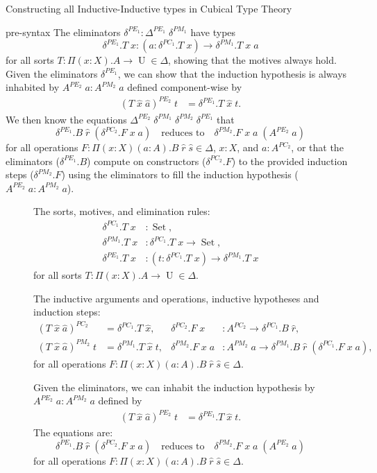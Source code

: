 \documentclass[runningheads]{llncs}
\DeclareMathOperator{\USet}{Set}
\DeclareMathOperator{\UU}{U}
\begin{document}
{\begin{section}{Constructing all Inductive-Inductive types in Cubical Type Theory}
\begin{subsection}{pre-syntax}
The eliminators $\delta^{PE_1} : \Delta^{PE_1}\;\delta^{PM_1}$ have types \[\delta^{PE_1}.T\;x : (a : \delta^{PC_1}.T\;x) \to \delta^{PM_1}.T\;x\;a\] for all sorts $T : \Pi(x : X).A\to\UU \in\Delta$, showing that the motives always hold. Given the eliminators $\delta^{PE_1}$, we can show that the induction hypothesis is always inhabited by $A^{PE_2}\;a : A^{PM_2}\;a$ defined component-wise by \begin{align*}(T\;\hat{x}\;\hat{a})^{PE_2}\;t &= \delta^{PE_1}.T\;\hat{x}\;t.\end{align*} We then know the equations $\Delta^{PE_2}\;\delta^{PM_1}\;\delta^{PM_2}\;\delta^{PE_1}$ that \[\delta^{PE_1}.B\;\hat{r}\;(\delta^{PC_2}.F\;x\;a)\quad\text{reduces to}\quad \delta^{PM_2}.F\;x\;a\;(A^{PE_2}\;a)\] for all operations $F : \Pi(x : X)(a : A).B\;\hat{r}\;\hat{s} \in \Delta$, $x : X$, and $a : A^{PC_2}$, or that the eliminators ($\delta^{PE_1}.B$) compute on constructors ($\delta^{PC_2}.F$) to the provided induction steps ($\delta^{PM_2}.F$) using the eliminators to fill the induction hypothesis ($A^{PE_2}\;a : A^{PM_2}\;a$).

\begin{figure}[htpb]
    \begin{flushleft}
    The sorts, motives, and elimination rules:
    \begin{align*}
    \delta^{PC_1}.T\;x &: \USet,\\
    \delta^{PM_1}.T\;x &: \delta^{PC_1}.T\;x \to \USet,\\
    \delta^{PE_1}.T\;x &: (t : \delta^{PC_1}.T\;x) \to \delta^{PM_1}.T\;x
    \end{align*}
    for all sorts $T : \Pi(x : X).A\to\UU \in\Delta$.
    
    The inductive arguments and operations, inductive hypotheses and induction steps:
    \begin{align*}
    (T\;\hat{x}\;\hat{a})^{PC_2} &= \delta^{PC_1}.T\;\hat{x},
    &\delta^{PC_2}.F\;x &: A^{PC_2} \to \delta^{PC_1}.B\;\hat{r},\\
    (T\;\hat{x}\;\hat{a})^{PM_2}\;t &= \delta^{PM_1}.T\;\hat{x}\;t,
    &\delta^{PM_2}.F\;x\;a &: A^{PM_2}\;a \to \delta^{PM_1}.B\;\hat{r}\;(\delta^{PC_1}.F\;x\;a),
    \end{align*}
    for all operations $F : \Pi(x : X)(a : A).B\;\hat{r}\;\hat{s} \in \Delta$.
    
    Given the eliminators, we can inhabit the induction hypothesis by $A^{PE_2}\;a : A^{PM_2}\;a$ defined by
    \begin{align*}
    (T\;\hat{x}\;\hat{a})^{PE_2}\;t &= \delta^{PE_1}.T\;\hat{x}\;t.
    \end{align*}
    The equations are:
    \[\delta^{PE_1}.B\;\hat{r}\;(\delta^{PC_2}.F\;x\;a)\quad\text{reduces to}\quad \delta^{PM_2}.F\;x\;a\;(A^{PE_2}\;a)\]
    for all operations $F : \Pi(x : X)(a : A).B\;\hat{r}\;\hat{s} \in \Delta$.
    

\end{flushleft}
\end{figure}
\end{subsection}
\end{section}}
\end{document}
